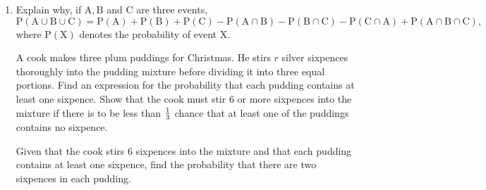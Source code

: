 \documentclass[a4, 11pt]{report}
\newlength{\qspace}
\newcounter{qnumber}
\newenvironment{question}%
 {\vspace{\qspace}
  \begin{enumerate}[\bfseries 1\quad][10]%
    \setcounter{enumi}{\value{qnumber}}%
    \item%
 }
{
  \end{enumerate}
  \filbreak
  \stepcounter{qnumber}
 }
\begin{document}
\begin{question}
Explain why, if $\mathrm{A, B}$ and  $\mathrm{C}$ are three events, 
\[
\mathrm{P(A \cup B \cup C) = P(A) + P(B) + P(C) - P(A \cap B) - P(B \cap C) - P(C \cap A) +P(A \cap B \cap C)},
\]
where $\mathrm{P(X)}$ denotes the probability of event $\mathrm{X}$.

A cook makes three plum puddings for Christmas. 
He stirs $r$ silver sixpences thoroughly into the pudding mixture before 
dividing it into three equal portions. Find an expression for the probability 
that each pudding contains at least one sixpence. 
Show that the cook must stir 6 or more sixpences into the mixture 
if there is to be less than ${1 \over 3}$ chance that 
at least one of the puddings contains no sixpence.

Given that the cook stirs 6 sixpences into the mixture and   that  
each pudding contains at least one sixpence, 
find  the probability that there are two  sixpences in each pudding.
\end{question}
	
\end{document}
